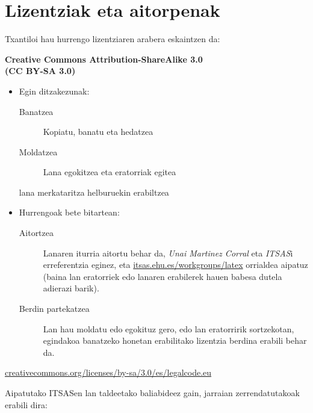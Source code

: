 %

\section{Lizentziak eta aitorpenak}

Txantiloi hau hurrengo lizentziaren arabera eskaintzen da:

\begin{center}
\large\bfseries
Creative Commons Attribution-ShareAlike 3.0\\(CC BY-SA 3.0)
\end{center}

\begin{itemize}
\item{Egin ditzakezunak:
 \begin{description}
  \item[Banatzea]{Kopiatu, banatu eta hedatzea}
  \item[Moldatzea]{Lana egokitzea eta eratorriak egitea}
  \item[lana merkataritza helburuekin erabiltzea]{}
 \end{description}
}
\item{Hurrengoak bete bitartean:
 \begin{description}
  \item[Aitortzea]{Lanaren iturria aitortu behar da, \emph{Unai Martinez Corral} eta \emph{ITSAS}i erreferentzia eginez, eta \url{itsas.ehu.es/workgroups/latex} orrialdea aipatuz (baina lan eratorriek edo lanaren erabilerek hauen babesa dutela adierazi barik).}
  \item[Berdin partekatzea]{Lan hau moldatu edo egokituz gero, edo lan eratorririk sortzekotan, egindakoa banatzeko honetan erabilitako lizentzia berdina erabili behar da.}
 \end{description}
}
\end{itemize}

\begin{center}
\large\url{creativecommons.org/licenses/by-sa/3.0/es/legalcode.eu}
\end{center}

\bigskip
\bigskip

Aipatutako ITSASen lan taldeetako baliabideez gain, jarraian zerrendatutakoak erabili dira:

